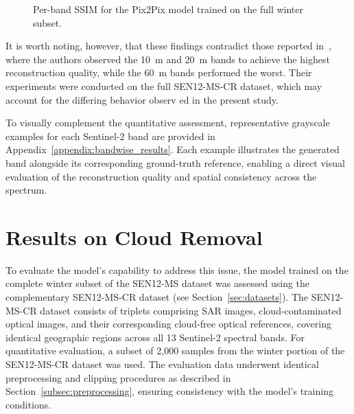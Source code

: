 \begin{figure}[!htbp]
\centering
{}
\caption[Per-band SSIM for the Pix2Pix model]{Per-band SSIM for the Pix2Pix model trained on the full winter subset.}
\label{fig:ssim_per_band}
\end{figure}

It is worth noting, however, that these findings contradict those reported in~\cite{CR_SEN2_dRNN}, where the authors observed the 10~m and 20~m bands to achieve the highest reconstruction quality, while the 60~m bands performed the worst. Their experiments were conducted on the full SEN12-MS-CR dataset, which may account for the differing behavior observ ed in the present study.

To visually complement the quantitative assessment, representative grayscale examples for each Sentinel-2 band are provided in Appendix~\ref{appendix:bandwise_results}. Each example illustrates the generated band alongside its corresponding ground-truth reference, enabling a direct visual evaluation of the reconstruction quality and spatial consistency across the spectrum.

\section{Results on Cloud Removal}
\label{sec:cloud_removal}
To evaluate the model’s capability to address this issue, the model trained on the complete winter subset of the SEN12-MS dataset was assessed using the complementary SEN12-MS-CR dataset (see Section~\ref{sec:datasets}). The SEN12-MS-CR dataset consists of triplets comprising SAR images, cloud-contaminated optical images, and their corresponding cloud-free optical references, covering identical geographic regions across all 13 Sentinel-2 spectral bands.
For quantitative evaluation, a subset of 2,000 samples from the winter portion of the SEN12-MS-CR dataset was used. The evaluation data underwent identical preprocessing and clipping procedures as described in Section~\ref{subsec:preprocessing}, ensuring consistency with the model’s training conditions.

